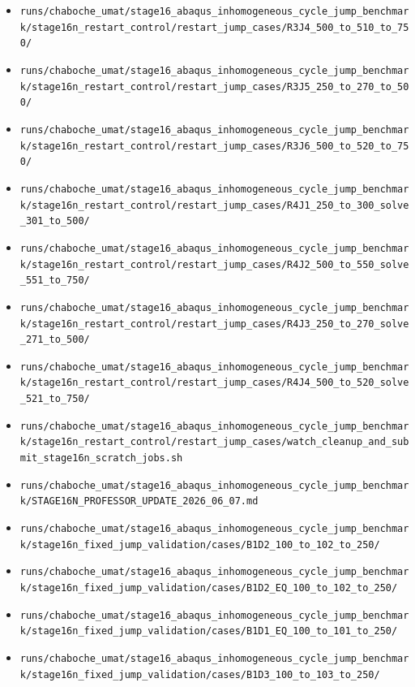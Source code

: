 \documentclass[11pt,a4paper]{article}
\newcommand{\code}[1]{\texttt{#1}}
\begin{document}
\begin{itemize}
  \item \code{runs/chaboche\_umat/stage16\_abaqus\_inhomogeneous\_cycle\_jump\_benchmark/stage16n\_restart\_control/restart\_jump\_cases/R3J4\_500\_to\_510\_to\_750/}
  \item \code{runs/chaboche\_umat/stage16\_abaqus\_inhomogeneous\_cycle\_jump\_benchmark/stage16n\_restart\_control/restart\_jump\_cases/R3J5\_250\_to\_270\_to\_500/}
  \item \code{runs/chaboche\_umat/stage16\_abaqus\_inhomogeneous\_cycle\_jump\_benchmark/stage16n\_restart\_control/restart\_jump\_cases/R3J6\_500\_to\_520\_to\_750/}
  \item \code{runs/chaboche\_umat/stage16\_abaqus\_inhomogeneous\_cycle\_jump\_benchmark/stage16n\_restart\_control/restart\_jump\_cases/R4J1\_250\_to\_300\_solve\_301\_to\_500/}
  \item \code{runs/chaboche\_umat/stage16\_abaqus\_inhomogeneous\_cycle\_jump\_benchmark/stage16n\_restart\_control/restart\_jump\_cases/R4J2\_500\_to\_550\_solve\_551\_to\_750/}
  \item \code{runs/chaboche\_umat/stage16\_abaqus\_inhomogeneous\_cycle\_jump\_benchmark/stage16n\_restart\_control/restart\_jump\_cases/R4J3\_250\_to\_270\_solve\_271\_to\_500/}
  \item \code{runs/chaboche\_umat/stage16\_abaqus\_inhomogeneous\_cycle\_jump\_benchmark/stage16n\_restart\_control/restart\_jump\_cases/R4J4\_500\_to\_520\_solve\_521\_to\_750/}
  \item \code{runs/chaboche\_umat/stage16\_abaqus\_inhomogeneous\_cycle\_jump\_benchmark/stage16n\_restart\_control/restart\_jump\_cases/watch\_cleanup\_and\_submit\_stage16n\_scratch\_jobs.sh}
  \item \code{runs/chaboche\_umat/stage16\_abaqus\_inhomogeneous\_cycle\_jump\_benchmark/STAGE16N\_PROFESSOR\_UPDATE\_2026\_06\_07.md}
  \item \code{runs/chaboche\_umat/stage16\_abaqus\_inhomogeneous\_cycle\_jump\_benchmark/stage16n\_fixed\_jump\_validation/cases/B1D2\_100\_to\_102\_to\_250/}
  \item \code{runs/chaboche\_umat/stage16\_abaqus\_inhomogeneous\_cycle\_jump\_benchmark/stage16n\_fixed\_jump\_validation/cases/B1D2\_EQ\_100\_to\_102\_to\_250/}
  \item \code{runs/chaboche\_umat/stage16\_abaqus\_inhomogeneous\_cycle\_jump\_benchmark/stage16n\_fixed\_jump\_validation/cases/B1D1\_EQ\_100\_to\_101\_to\_250/}
  \item \code{runs/chaboche\_umat/stage16\_abaqus\_inhomogeneous\_cycle\_jump\_benchmark/stage16n\_fixed\_jump\_validation/cases/B1D3\_100\_to\_103\_to\_250/}

\end{itemize}
\end{document}
